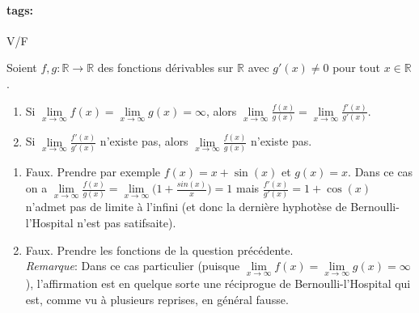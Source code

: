 \documentclass[12pt]{article}
\newcommand*{\xfield}[1]{\begin{mdframed}\centering #1\end{mdframed}\bigskip}
\newenvironment{note}{}{}
\newcommand*{\tags}[1]{\paragraph{tags: }#1}
\begin{document}
\begin{note}
\tags{V/F}
	\xfield{Soient $f,g: \mathbb{R} \to \mathbb{R}$ des fonctions dérivables sur $\mathbb{R}$ avec $g'(x) \neq 0$ pour tout $x \in \mathbb{R}$.
	\begin{enumerate}
		\item Si $\lim\limits_{x\to \infty} f(x) =\lim\limits_{x\to \infty} g(x) = \infty$, alors $\lim\limits_{x\to \infty} \frac{f(x)}{g(x)} = \lim\limits_{x\to \infty} \frac{f'(x)}{g'(x)}$.
		\item Si $\lim\limits_{x\to \infty} \frac{f'(x)}{g'(x)}$ n'existe pas, alors $\lim\limits_{x\to \infty} \frac{f(x)}{g(x)}$ n'existe pas.
	\end{enumerate} }
	\xfield{\begin{enumerate}
		\item Faux. Prendre par exemple $f(x) = x + \sin(x)$ et $g(x) = x$. Dans ce cas on a $\lim\limits_{x\to \infty} \frac{f(x)}{g(x)}=\lim\limits_{x\to \infty}\big(1+\frac{sin(x)}{x}\big) = 1$ mais $\frac{f'(x)}{g'(x)} = 1+ \cos(x)$ n'admet pas de limite à l'infini (et donc la dernière hyphotèse de Bernoulli-l'Hospital n'est pas satifsaite).
		\item Faux. Prendre les fonctions de la question précédente.\\
		\emph{Remarque}: Dans ce cas particulier (puisque $\lim\limits_{x\to \infty} f(x) = \lim\limits_{x\to \infty} g(x) = \infty$), l'affirmation est en quelque sorte une réciprogue de Bernoulli-l'Hospital qui est, comme vu à plusieurs reprises, en général fausse.
	\end{enumerate} }
\end{note}
\end{document}
